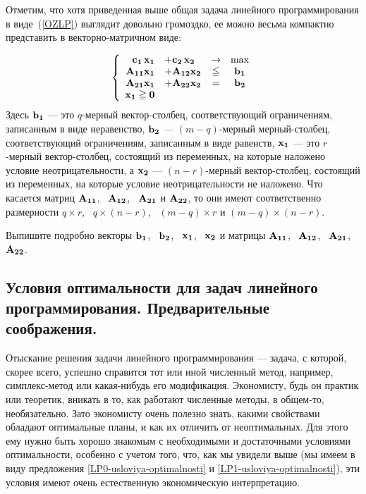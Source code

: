 Отметим, что хотя приведенная выше общая задача линейного
программирования в виде~(\ref{OZLP}) выглядит довольно громоздко, ее
можно весьма компактно представить в векторно-матричном виде:

\begin{equation}\label{OZLPV}
\left\{
\begin{array}{rlcc}
    \mathbf{c_1} \, \mathbf{x_1} &+ \mathbf{c_2} \, \mathbf{x_2} &\to & \max \\
   \mathbf{A_{11}} \mathbf{x_1}          &+ \mathbf{A_{12}} \mathbf{x_2} & \leqq &\mathbf{b_1}\\
  \mathbf{A_{21}}  \mathbf{x_1}          &+ \mathbf{A_{22}} \mathbf{x_2} & = &\mathbf{b_2}\\
  \mathbf{x_1} \geqq \mathbf{0}&\\
\end{array} \right.
\end{equation}
Здесь $\mathbf{b_1}$ --- это $q$-мерный вектор-столбец, соответствующий
ограничениям, записанным в виде неравенство,  $\mathbf{b_2}$
--- $(m-q)$-мерный мерный-столбец, соответствующий ограничениям,
записанным в виде равенств, $\mathbf{x_1}$ --- это $r$-мерный
вектор-столбец, состоящий из  переменных, на которые наложено
условие неотрицательности, а $\mathbf{x_2}$ --- $(n-r)$-мерный
вектор-столбец, состоящий из переменных, на которые условие
неотрицательности не наложено. Что касается матриц $\mathbf{A_{11}}$, \
$\mathbf{A_{12}}$, \  $\mathbf{A_{21}}$ и $\mathbf{A_{22}}$, то они имеют
соответственно размерности $q \times r$, \ $q \times (n-r)$, \
$(m-q) \times r$ и $(m-q) \times (n-r)$.

\begin{exer}
Выпишите подробно векторы $\mathbf{b_1}$, \ $\mathbf{b_2}$, \ $\mathbf{x_1}$, \
$\mathbf{x_2}$ и матрицы $\mathbf{A_{11}}$, \ $\mathbf{A_{12}}$, \
$\mathbf{A_{21}}$, \ $\mathbf{A_{22}}$.
\end{exer}







\subsection{Условия оптимальности для задач линейного
программирования. Предварительные соображения.}

Отыскание решения задачи линейного программирования --- задача, с
которой, скорее всего, успешно справится тот или иной численный
метод, например, симплекс-метод или какая-нибудь его модификация.
Экономисту, будь он практик или теоретик, вникать в то, как работают
численные методы, в общем-то, необязательно. Зато экономисту очень
полезно знать, какими свойствами обладают оптимальные планы, и как
их отличить от неоптимальных. Для этого ему нужно быть хорошо
знакомым с необходимыми и достаточными условиями оптимальности,
особенно с учетом того, что, как мы увидели выше (мы имеем в виду
предложения \ref{LP0-usloviya-optimalnosti} и
\ref{LP1-usloviya-optimalnosti}), эти условия имеют очень
естественную экономическую интерпретацию.


